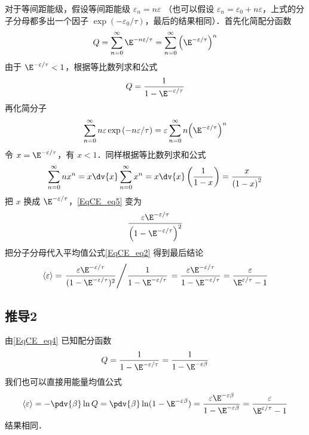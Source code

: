 对于等间距能级，假设等间距能级 ${\varepsilon_n} = n\varepsilon$ （也可以假设 ${\varepsilon_n} = {\varepsilon_0} + n\varepsilon $，上式的分子分母都多出一个因子 $\exp ( - {\varepsilon_0}/\tau )$，最后的结果相同）．首先化简配分函数
\begin{equation}
Q = \sum\limits_{n = 0}^\infty  {{\E^{ - n\varepsilon /\tau }}}  = \sum\limits_{n = 0}^\infty  {{{\left( {{\E^{ - \varepsilon /\tau }}} \right)}^n}} 
\end{equation}
由于 ${\E^{ - \varepsilon /\tau }} < 1$，根据等比数列求和公式 %
\begin{equation}\label{EqCE_eq4}
Q = \frac{1}{{1 - {\E^{ - \varepsilon /\tau }}}}
\end{equation}
再化简分子
\begin{equation}\label{EqCE_eq5}
\sum\limits_{n = 0}^\infty  {n\varepsilon \exp \left( { - n\varepsilon /\tau } \right)}  = \varepsilon \sum\limits_{n = 0}^\infty  {n{{\left( {{\E^{ - \varepsilon /\tau }}} \right)}^n}}
\end{equation}
令 $x = {\E^{ - \varepsilon /\tau }}$，有 $x < 1$．同样根据等比数列求和公式
\begin{equation}
\sum\limits_{n = 0}^\infty  {n{x^n}}  = x\dv{x}\sum\limits_{n = 0}^\infty  {{x^n}}  = x\dv{x}\left( {\frac{1}{{1 - x}}} \right) = \frac{x}{{{{\left( {1 - x} \right)}^2}}}
\end{equation}
把 $x$ 换成 ${\E^{ - \varepsilon /\tau }}$，\autoref{EqCE_eq5} 变为
\begin{equation}
\frac{{\varepsilon {\E^{ - \varepsilon /\tau }}}}{{{{\left( {1 - {\E^{ - \varepsilon /\tau }}} \right)}^2}}}
\end{equation}
把分子分母代入平均值公式\autoref{EqCE_eq2} 得到最后结论
\begin{equation}
\langle \varepsilon \rangle = \left. \frac{\varepsilon \E^{-\varepsilon/\tau}}{(1 - \E^{-\varepsilon /\tau})^2} \middle/ \frac{1}{1 - \E^{-\varepsilon/\tau}}  \right. = \frac{\varepsilon \E^{-\varepsilon/\tau}}{1 - \E^{-\varepsilon/\tau}} = \frac{\varepsilon}{\E^{\varepsilon/\tau} - 1}
\end{equation}

\subsection{推导2}
由\autoref{EqCE_eq4} 已知配分函数
\begin{equation}
Q = \frac{1}{{1 - {\E^{ - \varepsilon /\tau }}}} = \frac{1}{{1 - {\E^{ - \varepsilon\beta }}}}
\end{equation}
我们也可以直接用能量均值公式
\begin{equation}
\langle\varepsilon\rangle = -\pdv{\beta} \ln Q
= \pdv{\beta} \ln (1 - {\E^{ - \varepsilon \beta }}) = \frac{{\varepsilon {\E^{ - \varepsilon \beta }}}}{{1 - {\E^{ - \varepsilon \beta }}}} = \frac{\varepsilon }{{{\E^{\varepsilon /\tau }} - 1}}
\end{equation}
结果相同．
